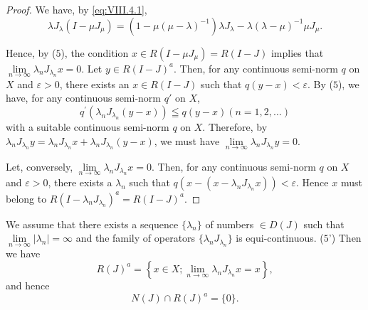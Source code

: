 \begin{proof}
 We have, by \eqref{eq:VIII.4.1}, 
\begin{equation}\label{eq:VIII.4.8}
\lambda J _{\lambda} (I - \mu J _{\mu}) = (1 - \mu (\mu - \lambda) ^{-1}) \lambda J _{\lambda} - \lambda (\lambda - \mu) ^{-1} \mu J _{\mu}. \end{equation}

Hence, by ($5$), the condition $x \in R(I - \mu J_{\mu}) = R(I - J)$ implies that $\lim\limits_{n \to \infty} \lambda_n J_{\lambda_n} x = 0$. Let $y \in R(I - J)^a$. Then, for any continuous semi-norm $q$ on $X$ and $\varepsilon > 0$, there exists an $x \in R(I - J)$ such that $q(y - x) < \varepsilon$. By ($5$), we have, for any continuous semi-norm $q'$ on $X$, 
\[
q ^{\prime} \left(\lambda_{n} J _ {\lambda_{n}} (y - x)\right) \leqq q (y - x) (n = 1, 2, \dots)
\]
with a suitable continuous semi-norm $q$ on $X$. Therefore, by $\lambda_{n}J_{\lambda_{n}}y = \lambda_{n}J_{\lambda_{n}}x + \lambda_{n}J_{\lambda_{n}}(y - x)$, we must have $\lim\limits_{n\to \infty}\lambda_nJ_{\lambda_n}y = 0$. 

Let, conversely, $\lim\limits_{n\to \infty}\lambda_nJ_{\lambda_n}x = 0$. Then, for any continuous semi-norm $q$ on $X$ and $\varepsilon >0$, there exists a $\lambda_{n}$ such that $q(x - (x - \lambda_nJ_{\lambda_n}x)) < \varepsilon$. Hence $x$ must belong to $R(I - \lambda_nJ_{\lambda_n})^a = R(I - J)^a$. 
\end{proof}

\begin{lemman}\label{lem:VIII.4.Lemma.1prime} We assume that there exists a sequence $\{\lambda_n\}$ of numbers $\in D(J)$ such that 
$\lim\limits_{n\to\infty}\left|\lambda_{n}\right|=\infty$ and the family of operators $\{\lambda_{n}J_{\lambda_{n}}\}$ is equi-continuous. ($5$') Then we have 
\begin{equation}\tag{6'}\label{eq:VIII.4.6'}
R (J) ^{a} = \left\{x \in X; \lim\limits _{n \rightarrow \infty} \lambda_{n} J _ {\lambda_{n}} x = x \right\},
\end{equation}
and hence 
\begin{equation}\tag{7'}\label{eq:VIII.4.7'}
N (J) \cap R (J) ^{a} = \{0 \}.
\end{equation}
\end{lemman}

